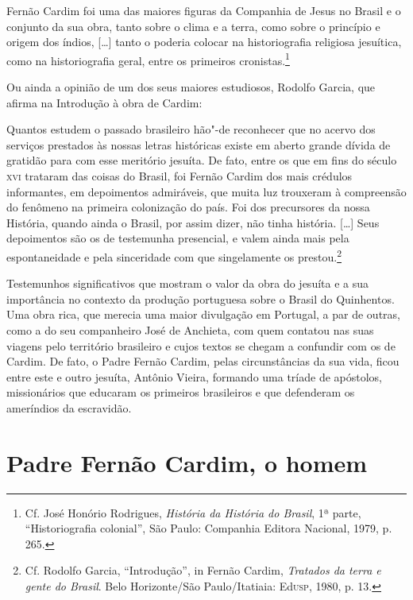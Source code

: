 \begin{hedraquote} 
Fernão Cardim foi uma das maiores figuras da
Companhia de Jesus no Brasil e o conjunto da sua obra, tanto sobre o
clima e a terra, como sobre o princípio e origem dos índios, [\ldots{}]
tanto o poderia colocar na historiografia religiosa jesuítica, como na
historiografia geral, entre os primeiros cronistas.\footnote{ Cf. 
José Honório Rodrigues, \textit{História da História do Brasil}, 
1ª parte, ``Historiografia colonial'', São Paulo: Companhia Editora
Nacional, 1979, p. 265.}
\end{hedraquote}

Ou ainda a opinião de um dos seus maiores estudiosos, Rodolfo
Garcia, que afirma na Introdução à obra de Cardim:

\begin{hedraquote} 
Quantos estudem o passado brasileiro hão"-de reconhecer que
no acervo dos serviços prestados às nossas letras históricas existe em
aberto grande dívida de gratidão para com esse meritório jesuíta. De
fato, entre os que em fins do século \textsc{xvi} trataram das coisas do
Brasil, foi Fernão Cardim dos mais crédulos informantes, em depoimentos
admiráveis, que muita luz trouxeram à compreensão do fenômeno na
primeira colonização do país. Foi dos precursores da nossa História,
quando ainda o Brasil, por assim dizer, não tinha história. [\ldots{}] Seus
depoimentos são os de testemunha presencial, e valem ainda mais pela
espontaneidade e pela sinceridade com que singelamente os prestou.\footnote{ Cf. 
Rodolfo Garcia, ``Introdução'', in Fernão Cardim, \textit{Tratados da terra e 
gente do Brasil}. Belo Horizonte/São Paulo/Itatiaia: Ed\textsc{usp}, 1980, p. 13.} 
\end{hedraquote}

Testemunhos significativos que mostram o valor da obra do
jesuíta e a sua importância no contexto da produção portuguesa sobre o
Brasil do Quinhentos. Uma obra rica, que merecia uma maior divulgação em
Portugal, a par de outras, como a do seu companheiro José de Anchieta,
com quem contatou nas suas viagens pelo território brasileiro e cujos
textos se chegam a confundir com os de Cardim. De fato, o Padre Fernão
Cardim, pelas circunstâncias da sua vida, ficou entre este e outro
jesuíta, Antônio Vieira, formando uma tríade de apóstolos, missionários
que educaram os primeiros brasileiros e que defenderam os ameríndios da
escravidão. 

\section{Padre Fernão Cardim, o homem}

